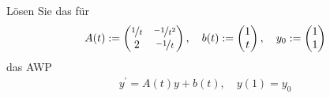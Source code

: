 \begin{exercise}
    Lösen Sie das für
    \begin{align*}
        A(t) := 
        \begin{pmatrix}
            \nicefrac{1}{t} & \nicefrac{-1}{t^2} \\
            2 & \nicefrac{-1}{t}
        \end{pmatrix},
        \quad b(t) :=
        \begin{pmatrix}
            1 \\ t
        \end{pmatrix},
        \quad y_0 :=
        \begin{pmatrix}
            1 \\ 1
        \end{pmatrix}
    \end{align*}
    das AWP
    \begin{align*}
        y^\prime = A(t) y + b(t), \quad y(1) = y_0
    \end{align*}
\end{exercise}


